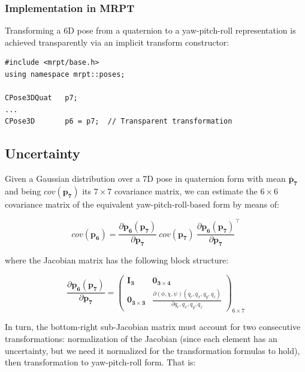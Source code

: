 \documentclass[a4paper,11pt]{report}
\begin{document}
\subsubsection{Implementation in MRPT}

Transforming a 6D pose from a quaternion to a yaw-pitch-roll representation is 
achieved transparently via an implicit transform constructor:

\begin{lstlisting}
#include <mrpt/base.h> 
using namespace mrpt::poses; 

CPose3DQuat   p7;
...
CPose3D       p6 = p7;  // Transparent transformation
\end{lstlisting}



\subsection{Uncertainty}

Given a Gaussian distribution over a 7D pose in quaternion form with 
mean ${\mathbf{\bar{p}_7}}$ and being $cov(\mathbf{p_7})$ its $7 \times 7$ covariance matrix, 
we can estimate the $6 \times 6$ covariance matrix of the equivalent yaw-pitch-roll-based 
form by means of:

\begin{equation}
cov(\mathbf{p_6}) =
\frac{\partial \mathbf{p_6}(\mathbf{p_7}) }{\partial \mathbf{p_7}} ~ 
cov(\mathbf{p_7})  ~
\frac{\partial \mathbf{p_6}(\mathbf{p_7}) }{\partial \mathbf{p_7}}^\top 
\end{equation}

\noindent where the Jacobian matrix has the following block structure:

\begin{equation}
\label{eq:jac_p6_p7}
\frac{\partial \mathbf{p_6}(\mathbf{p_7}) }{\partial \mathbf{p_7}} =
\left(
\begin{array}{c|c}
 \mathbf{I_3} & \mathbf{0_{3\times 4}} \\ \hline
 \mathbf{0_{3\times 3}} &  \frac{\partial (\phi,\chi,\psi)(q_r,q_x,q_y,q_z)}{\partial q_r,q_x,q_y,q_z}
\end{array}
\right)_{6 \times 7}
\end{equation}

In turn, the bottom-right sub-Jacobian matrix must account for two consecutive transformations: 
normalization of the Jacobian (since each element has an uncertainty, but we need it normalized
for the transformation formulas to hold), then transformation to yaw-pitch-roll form. That is:
\end{document}
